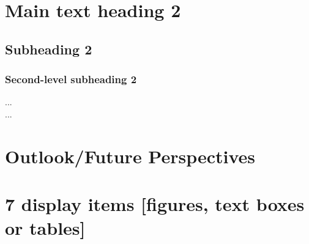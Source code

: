 \documentclass[fleqn,10pt]{wlscirep}
\begin{document}
\section*{Main text heading 2}

\subsection*{Subheading 2}
\subsubsection*{Second-level subheading 2}
...\\
...

\section*{Outlook/Future Perspectives}

\section*{7 display items [figures, text boxes or tables]}

\end{document}
